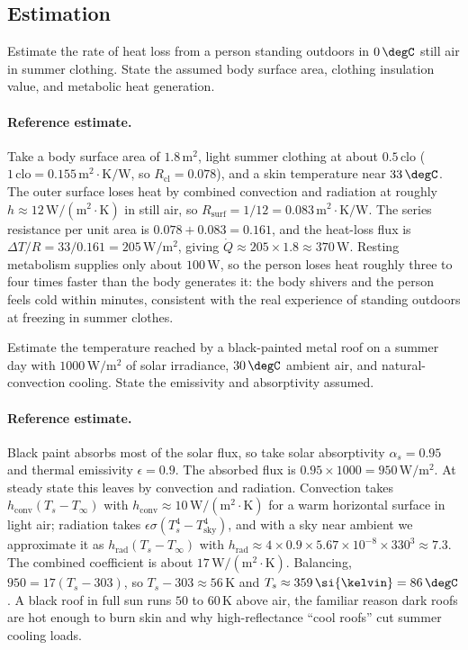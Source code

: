 \subsection*{Estimation}

\begin{exercise}
Estimate the rate of heat loss from a person standing outdoors in
$0\,\degC$ still air in summer clothing. State the assumed body
surface area, clothing insulation value, and metabolic heat
generation.
\paragraph{Reference estimate.} Take a body surface area of $1.8\,
\text{m}^2$, light summer clothing at about $0.5\,\text{clo}$
($1\,\text{clo} = 0.155\,\text{m}^2\cdot\si{\kelvin}/\text{W}$, so
$R_{\text{cl}} = 0.078$), and a skin temperature near $33\,\degC$. The
outer surface loses heat by combined convection and radiation at roughly
$h \approx 12\,\text{W}/(\text{m}^2\cdot\si{\kelvin})$ in still air, so
$R_{\text{surf}} = 1/12 = 0.083\,\text{m}^2\cdot\si{\kelvin}/\text{W}$.
The series resistance per unit area is $0.078 + 0.083 = 0.161$, and the
heat-loss flux is $\Delta T/R = 33/0.161 = 205\,\text{W}/\text{m}^2$,
giving $\dot{Q} \approx 205 \times 1.8 \approx 370\,\text{W}$. Resting
metabolism supplies only about $100\,\text{W}$, so the person loses heat
roughly three to four times faster than the body generates it: the body
shivers and the person feels cold within minutes, consistent with the
real experience of standing outdoors at freezing in summer clothes.
\end{exercise}

\begin{exercise}
Estimate the temperature reached by a black-painted metal roof on a
summer day with $1000\,\text{W}/\text{m}^2$ of solar irradiance,
$30\,\degC$ ambient air, and natural-convection cooling. State the
emissivity and absorptivity assumed.
\paragraph{Reference estimate.} Black paint absorbs most of the solar
flux, so take solar absorptivity $\alpha_s = 0.95$ and thermal
emissivity $\epsilon = 0.9$. The absorbed flux is $0.95 \times 1000 =
950\,\text{W}/\text{m}^2$. At steady state this leaves by convection and
radiation. Convection takes $h_{\text{conv}}(T_s - T_\infty)$ with
$h_{\text{conv}} \approx 10\,\text{W}/(\text{m}^2\cdot\si{\kelvin})$ for
a warm horizontal surface in light air; radiation takes $\epsilon\sigma
(T_s^4 - T_{\text{sky}}^4)$, and with a sky near ambient we approximate
it as $h_{\text{rad}}(T_s - T_\infty)$ with $h_{\text{rad}} \approx 4
\times 0.9 \times 5.67\times10^{-8} \times 330^3 \approx 7.3$. The
combined coefficient is about $17\,\text{W}/(\text{m}^2\cdot
\si{\kelvin})$. Balancing, $950 = 17(T_s - 303)$, so $T_s - 303 \approx
56\,\si{\kelvin}$ and $T_s \approx 359\,\si{\kelvin} = 86\,\degC$. A
black roof in full sun runs $50$ to $60\,\si{\kelvin}$ above air, the
familiar reason dark roofs are hot enough to burn skin and why
high-reflectance ``cool roofs'' cut summer cooling loads.
\end{exercise}

